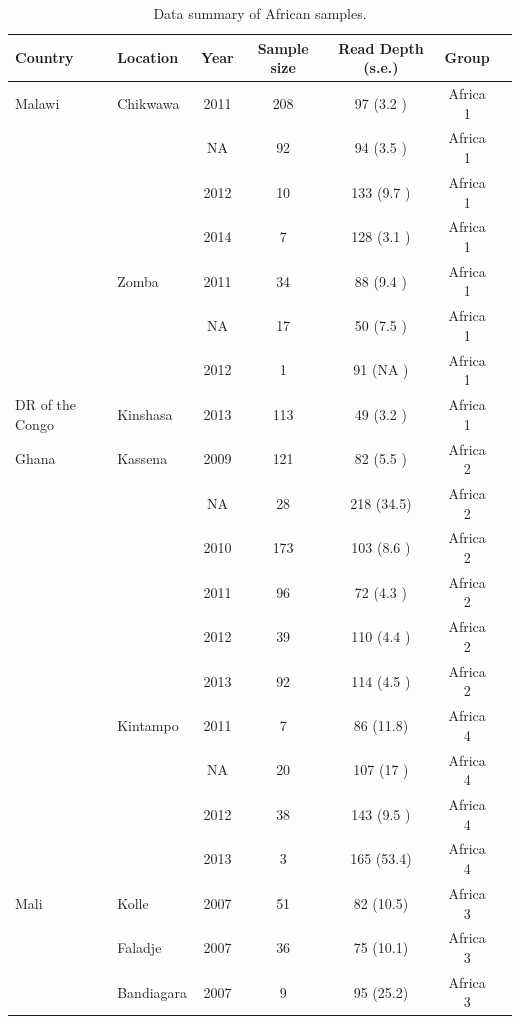 \documentclass[9pt,lineno]{elife}
\begin{document}
\begin{table}[bt]
  \caption{Data summary of African samples.}\label{tab:Pf3ksamples}
\begin{tabular}{l l c c c c c}
\toprule
Country & Location & Year & Sample size & Read Depth (s.e.) & Group \\
\midrule
Malawi          &Chikwawa       &2011 &208  &97   (3.2 )&Africa 1\\
                &               &NA   &92   &94   (3.5 )&Africa 1\\
                &               &2012 &10   &133  (9.7 )&Africa 1\\
                &               &2014 &7    &128  (3.1 )&Africa 1\\
                &Zomba          &2011 &34   &88   (9.4 )&Africa 1\\
                &               &NA   &17   &50   (7.5 )&Africa 1\\
                &               &2012 &1    &91   (NA  )&Africa 1\\
 \hline
DR of the Congo &Kinshasa       &2013 &113  &49   (3.2 )&Africa 1\\
 \hline
Ghana           &Kassena        &2009 &121  &82   (5.5 )&Africa 2\\
                &               &NA   &28   &218  (34.5)&Africa 2\\
                &               &2010 &173  &103  (8.6 )&Africa 2\\
                &               &2011 &96   &72   (4.3 )&Africa 2\\
                &               &2012 &39   &110  (4.4 )&Africa 2\\
                &               &2013 &92   &114  (4.5 )&Africa 2\\
                &Kintampo       &2011 &7    &86   (11.8)&Africa 4\\
                &               &NA   &20   &107  (17  )&Africa 4\\
                &               &2012 &38   &143  (9.5 )&Africa 4\\
                &               &2013 &3    &165  (53.4)&Africa 4\\
 \hline
Mali            &Kolle          &2007 &51   &82   (10.5)&Africa 3\\
                &Faladje        &2007 &36   &75   (10.1)&Africa 3\\
                &Bandiagara     &2007 &9    &95   (25.2)&Africa 3\\

\end{tabular}
\end{table}
\end{document}

